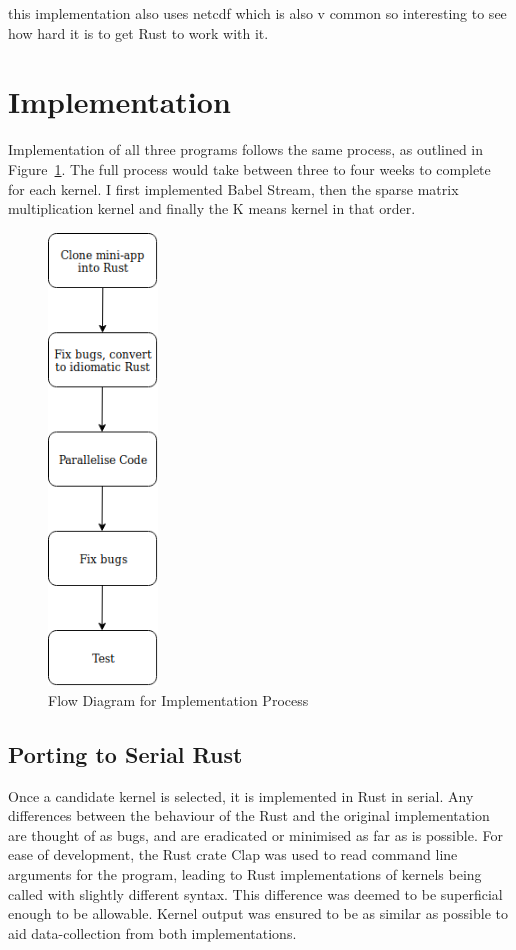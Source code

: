 this implementation also uses netcdf which is also v common so interesting to see how hard it is to get Rust to work with it.

\section{Implementation}
Implementation of all three programs follows the same process, as outlined in Figure~\ref{fig:imp-flow}. The full process would take between three to four weeks to complete for each kernel. I first implemented Babel Stream, then the sparse matrix multiplication kernel and finally the K means kernel in that order.

\begin{figure}
  \center
  \includegraphics[height=12cm]{figs/ImplementationFlow.png}
  \caption{Flow Diagram for Implementation Process}
  \label{fig:imp-flow}
\end{figure}

\subsection{Porting to Serial Rust}
Once a candidate kernel is selected, it is implemented in Rust in serial. Any differences between the  behaviour of the Rust and the original implementation are thought of as bugs, and are eradicated or minimised as far as is possible. For ease of development, the Rust crate Clap was used to read command line arguments for the program, leading to Rust implementations of kernels being called with slightly different syntax. This difference was deemed to be superficial enough to be allowable. Kernel output was ensured to be as similar as possible to aid data-collection from both implementations.

